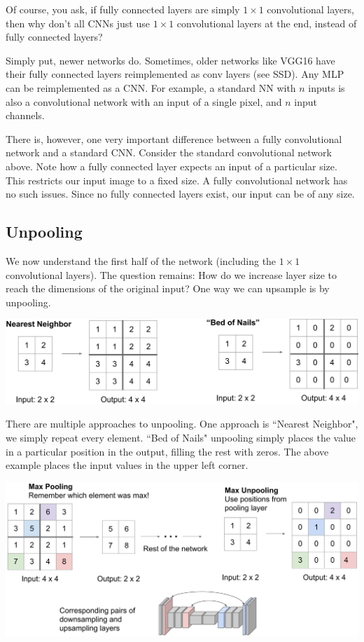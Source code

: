 \documentclass{article}
\begin{document}
Of course, you ask, if fully connected layers are simply $1\times1$ convolutional layers, then why don't all CNNs just use $1\times1$ convolutional layers at the end, instead of fully connected layers?

Simply put, newer networks do. Sometimes, older networks like VGG16 have their fully connected layers reimplemented as conv layers (see SSD). Any MLP can be reimplemented as a CNN. For example, a standard NN with $n$ inputs is also a convolutional network with an input of a single pixel, and $n$ input channels.

There is, however, one very important difference between a fully convolutional network and a standard CNN. Consider the standard convolutional network above. Note how a fully connected layer expects an input of a particular size. This restricts our input image to a fixed size. A fully convolutional network has no such issues. Since no fully connected layers exist, our input can be of any size.


\subsection{Unpooling}
We now understand the first half of the network (including the $1\times1$ convolutional layers). The question remains: How do we increase layer size to reach the dimensions of the original input? One way we can upsample is by unpooling.

\begin{center}
\includegraphics[scale=0.3]{unpooling1.PNG}
\end{center}

There are multiple approaches to unpooling. One approach is ``Nearest Neighbor", we simply repeat every element. ``Bed of Nails" unpooling simply places the value in a particular position in the output, filling the rest with zeros. The above example places the input values in the upper left corner.

\begin{center}
\includegraphics[scale=0.3]{maxunpooling.png}
\end{center}
\end{document}
